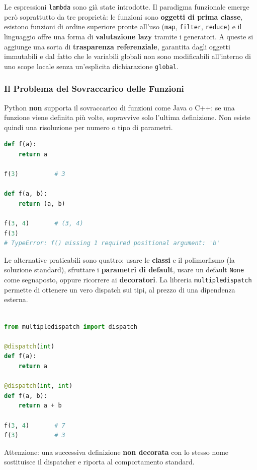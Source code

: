 \documentclass[12pt]{extarticle}
\begin{document}
\noindent Le espressioni \texttt{lambda} sono già state introdotte. Il paradigma funzionale emerge però soprattutto da tre proprietà: le funzioni sono \textbf{oggetti di prima classe}, esistono funzioni di ordine superiore pronte all'uso (\texttt{map}, \texttt{filter}, \texttt{reduce}) e il linguaggio offre una forma di \textbf{valutazione lazy} tramite i generatori. A queste si aggiunge una sorta di \textbf{trasparenza referenziale}, garantita dagli oggetti immutabili e dal fatto che le variabili globali non sono modificabili all'interno di uno scope locale senza un'esplicita dichiarazione \texttt{global}.

\subsubsection{Il Problema del Sovraccarico delle Funzioni}

\noindent Python \textbf{non} supporta il sovraccarico di funzioni come Java o C++: se una funzione viene definita più volte, sopravvive solo l'ultima definizione. Non esiste quindi una risoluzione per numero o tipo di parametri.

\begin{lstlisting}[language=Python]
def f(a):
    return a

f(3)          # 3

def f(a, b):
    return (a, b)

f(3, 4)       # (3, 4)
f(3)
# TypeError: f() missing 1 required positional argument: 'b'
\end{lstlisting}

\noindent Le alternative praticabili sono quattro: usare le \textbf{classi} e il polimorfismo (la soluzione standard), sfruttare i \textbf{parametri di default}, usare un default \texttt{None} come segnaposto, oppure ricorrere ai \textbf{decoratori}. La libreria \texttt{multipledispatch} permette di ottenere un vero dispatch sui tipi, al prezzo di una dipendenza esterna.

\begin{lstlisting}[language=Python]
% pip3 install multipledispatch

from multipledispatch import dispatch

@dispatch(int)
def f(a):
    return a

@dispatch(int, int)
def f(a, b):
    return a + b

f(3, 4)       # 7
f(3)          # 3
\end{lstlisting}

\noindent Attenzione: una successiva definizione \textbf{non decorata} con lo stesso nome sostituisce il dispatcher e riporta al comportamento standard.
\end{document}
